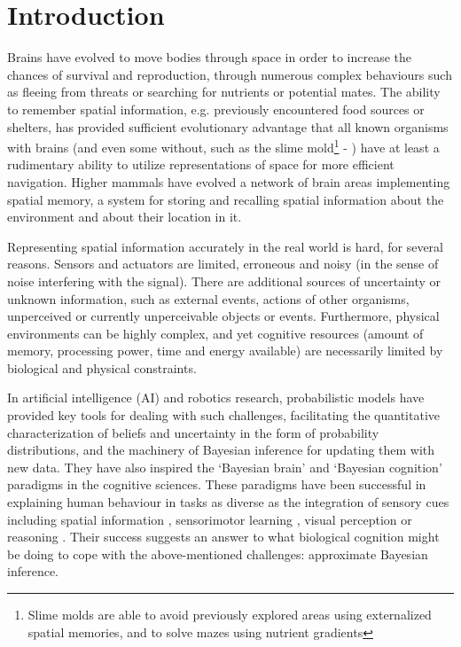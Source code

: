 \chapter{Introduction}
\label{cha:intro}


Brains have evolved to move bodies through space in order to increase the chances of survival and reproduction, through numerous complex behaviours such as fleeing from threats or searching for nutrients or potential mates. The ability to remember spatial information, e.g. previously encountered food sources or shelters, has provided sufficient evolutionary advantage that all known organisms with brains (and even some without, such as the slime mold\footnote{Slime molds are able to avoid previously explored areas using externalized spatial memories, and to solve mazes using nutrient gradients} - \citet{reid2012slime}) have at least a rudimentary ability to utilize representations of space for more efficient navigation. Higher mammals have evolved a network of brain areas implementing spatial memory, a system for storing and recalling spatial information about the environment and about their location in it.

Representing spatial information accurately in the real world is hard, for several reasons. Sensors and actuators are limited, erroneous and noisy (in the sense of noise interfering with the signal). There are additional sources of uncertainty or unknown information, such as external events, actions of other organisms, unperceived or currently unperceivable objects or events. Furthermore, physical environments can be highly complex, and yet cognitive resources (amount of memory, processing power, time and energy available) are necessarily limited by biological and physical constraints. 

In artificial intelligence (AI) and robotics research, probabilistic models have provided key tools for dealing with such challenges, facilitating the quantitative characterization of beliefs and uncertainty in the form of probability distributions, and the machinery of Bayesian inference for updating them with new data. They have also inspired the `Bayesian brain' \citep{knill2004bayesian} and `Bayesian cognition' \citep{chater2010bayesian} paradigms in the cognitive sciences. These paradigms have been successful in explaining human behaviour in tasks as diverse as the integration of sensory cues \citep{ernst2006bayesian} including spatial information \citep{cheng2007bayesian,nardini2008development}, sensorimotor learning \citep{kording2004bayesian}, visual perception \citep{yuille2006vision} or reasoning \citep{oaksford2007bayesian}. Their success suggests an answer to what biological cognition might be doing to cope with the above-mentioned challenges: approximate Bayesian inference.

